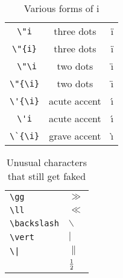\documentclass{article}
\begin{document}
\begin{table}
\begin{center}
\begin{tabular}{ccc}
\verb# \"i # & three dots & \"i \\
\verb#\"{i}#  & three dots & \"{i} \\
\verb# \"\i#  & two dots &  \"\i \\
\verb#\"{\i}#  & two dots &  \"{\i} \\
\verb#\'{\i}#  & acute accent &  \'{\i} \\
\verb#\'i#  & acute accent &  \'{\i} \\
\verb#\`{\i}#  & grave accent &  \`{\i} \\
\end{tabular}
\caption{Various forms of i}
\end{center}
\end{table}

\begin{table}
\begin{center}
\begin{tabular}{ll}
\verb#\gg# & $\gg$\\
\verb#\ll# & $\ll$\\
\verb#\backslash# & $\backslash$ \\
\verb#\vert# & $\vert$ \\
\verb#\|# & $\|$ \\
\verb#1\over2# & $1\over2$ 
\end{tabular}
\caption{Unusual characters that still get faked}
\end{center}
\end{table}
\end{document}
